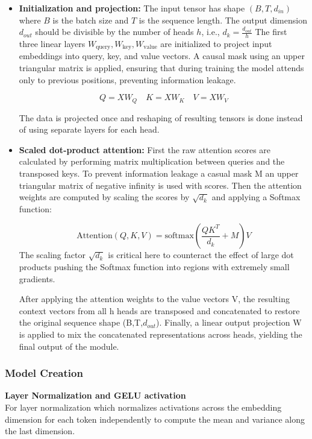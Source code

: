 \begin{itemize}
    \item \textbf{Initialization and projection: }
    The input tensor has shape $(B, T, d_{in})$ where $B$ is the batch size and $T$ is the sequence length. The output dimension $d_{out}$ should be divisible by the number of heads $h$, i.e.,
    $
      d_k = \frac{d_{out}}{h}
    $
    The first three linear layers $W_{\text{query}}, W_{\text{key}}, W_{\text{value}}$ are initialized to project input embeddings into query, key, and value vectors. A causal mask using an upper triangular matrix is applied, ensuring that during training the model attends only to previous positions, preventing information leakage.

    $$Q = XW_Q \quad K = XW_K \quad V = XW_V$$

    The data is projected once and reshaping of resulting tensors is done instead of using separate layers for each head.
    
    \item \textbf{Scaled dot-product attention: }
    First the raw attention scores are calculated by performing matrix multiplication between queries and the transposed keys. To prevent information leakage a casual mask M an upper triangular matrix of negative infinity is used with scores. Then the attention weights are computed by scaling the scores by $\sqrt{d_k}$ and applying a Softmax function:

    \begin{equation}
        \text{Attention}(Q, K, V) = \mathrm{softmax}\!\left(\frac{QK^{T}}{d_k} + M\right)V
    \end{equation}
    The scaling factor $\sqrt{d_k}$ is critical here to counteract the effect of large dot products pushing the Softmax function into regions with extremely small gradients.

    After applying the attention weights to the value vectors V, the resulting context vectors from all h heads are transposed and concatenated to restore the original sequence shape (B,T,$d_{out}$). Finally, a linear output projection W is applied to mix the concatenated representations across heads, yielding the final output of the module.
    
\end{itemize}

\subsubsection{Model Creation}
\textbf{Layer Normalization and GELU activation}\\
For layer normalization which normalizes activations across the embedding dimension for each token independently to compute the mean and variance along the last dimension.

